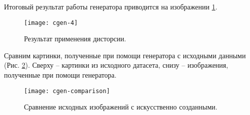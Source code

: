 Итоговый результат работы генератора приводится на изображении \ref{fig:cgen-4}.
\begin{figure}[h]
	\centering
	\texttt{[image: cgen-4]}
	\caption{Результат применения дисторсии.}
	\label{fig:cgen-4}
\end{figure}

Сравним картинки, полученные при помощи генератора с исходными данными (Рис. \ref{fig:cgen-comparison}). Сверху -- картинки из исходного датасета, снизу -- изображения, полученные при помощи генератора.
\begin{figure}[h]
	\centering
	\texttt{[image: cgen-comparison]}
	\caption{Сравнение исходных изображений с искусственно созданными.}
	\label{fig:cgen-comparison}
\end{figure}